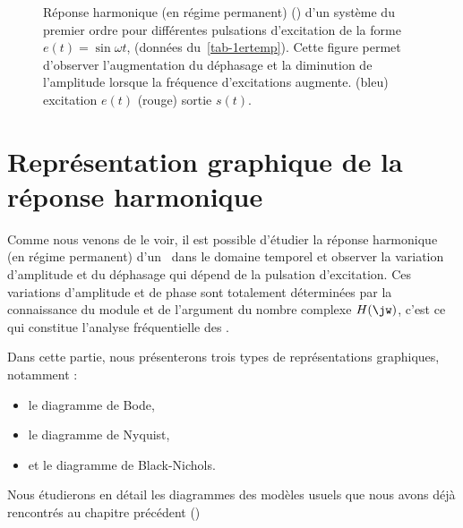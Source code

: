 \begin{figure}[!h]
\begin{center}
\caption{Réponse harmonique (en régime permanent) () d'un système du premier ordre
pour différentes pulsations d'excitation de la forme $e(t)=\sin{\omega t}$, (données du~\cref{tab-1ertemp}).
Cette figure permet d'observer l'augmentation du déphasage et la diminution 
de l'amplitude lorsque la fréquence d'excitations augmente. 
(bleu) excitation $e(t)$ (rouge) sortie $s(t)$.\label{fig-repham}}
\end{center}
\end{figure}







\newpage
\section{Représentation graphique de la réponse harmonique}

Comme nous venons de le voir, il est possible d'étudier
la réponse harmonique (en régime permanent) d'un \SLCI~dans le domaine 
temporel et observer la variation d'amplitude et du 
déphasage qui dépend de la pulsation d'excitation. Ces variations 
d'amplitude et de phase sont totalement déterminées par la 
connaissance du module et de l'argument du nombre complexe $H(\jw)$, c'est ce qui constitue 
l'analyse fréquentielle des \SLCI.

Dans cette partie, nous présenterons trois types de représentations graphiques, notamment :
\begin{itemize}
    \item le diagramme de Bode,
    \item le diagramme de Nyquist,
    \item et le diagramme de Black-Nichols. 
\end{itemize}
Nous étudierons en détail les diagrammes des 
modèles usuels que nous avons déjà rencontrés 
au chapitre précédent ()

